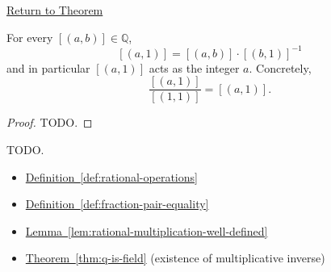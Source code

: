 \newpage
{}
\label{prf:ec-division-by-one}

\begin{remark*}[Return]
\hyperref[thm:ec-division-by-one]{Return to Theorem}
\end{remark*}

\begin{theorem*}
For every $[(a,b)]\in\mathbb{Q}$,
\[
[(a,1)] = [(a,b)]\cdot[(b,1)]^{-1}
\]
and in particular $[(a,1)]$ acts as the integer $a$.  Concretely,
\[
\frac{[(a,1)]}{[(1,1)]} = [(a,1)].
\]
\end{theorem*}

\begin{proof}
TODO.
\end{proof}

\begin{remark*}
TODO.
\end{remark*}

\begin{dependencies}
\begin{itemize}
  \item \hyperref[def:rational-operations]{Definition~\ref*{def:rational-operations}}
  \item \hyperref[def:fraction-pair-equality]{Definition~\ref*{def:fraction-pair-equality}}
  \item \hyperref[lem:rational-multiplication-well-defined]{Lemma~\ref*{lem:rational-multiplication-well-defined}}
  \item \hyperref[thm:q-is-field]{Theorem~\ref*{thm:q-is-field}}
        \textnormal{(existence of multiplicative inverse)}
\end{itemize}
\end{dependencies}
